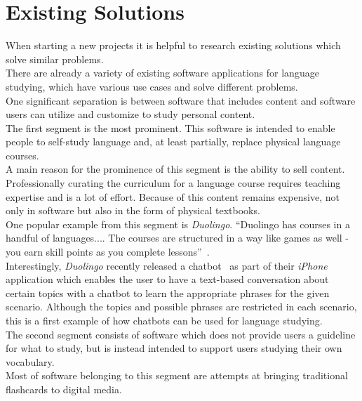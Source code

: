 \section{Existing Solutions}
\label{existing}


When starting a new projects it is helpful to research existing solutions which solve similar problems.
\\

There are already a variety of existing software applications for language studying, which have various use cases and solve different problems.
\\

One significant separation is between software that includes content and software users can utilize and customize to study personal content.
\\

The first segment is the most prominent.
This software is intended to enable people to self-study language and, at least partially, replace physical language courses.
\\
A main reason for the prominence of this segment is the ability to sell content.
Professionally curating the curriculum for a language course requires teaching expertise and is a lot of effort. Because of this content remains expensive, not only in software but also in the form of physical textbooks.
\\
One popular example from this segment is \emph{Duolingo}. ``Duolingo has courses in a handful of languages.... The courses are structured in a way like games as well - you earn skill points as you complete lessons''~\cite{lifehacker}.
\\
Interestingly, \emph{Duolingo} recently released a chatbot~\cite{topbots2} as part of their \emph{iPhone} application which enables the user to have a text-based conversation about certain topics with a chatbot to learn the appropriate phrases for the given scenario.
Although the topics and possible phrases are restricted in each scenario, this is a first example of how chatbots can be used for language studying.
\\

The second segment consists of software which does not provide users a guideline for what to study, but is instead intended to support users studying their own vocabulary.
\\
Most of software belonging to this segment are attempts at bringing traditional flashcards to digital media.
\\


